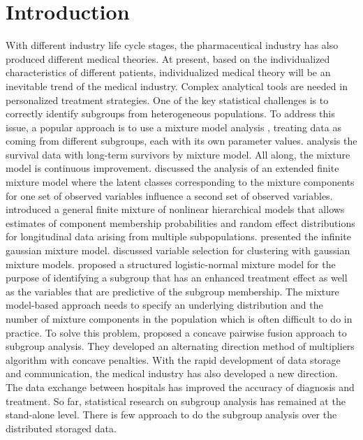 \documentclass[review]{elsarticle}
\begin{document}
\section{Introduction}
With different industry life cycle stages, the pharmaceutical industry has also produced different medical theories. At present,  based on the individualized characteristics of different patients, individualized medical theory will be an inevitable trend of the medical industry. Complex analytical tools are needed in personalized treatment strategies. One of the key statistical challenges is to correctly identify subgroups from heterogeneous populations. To address this issue, a popular approach is to use a mixture model analysis \cite{everitt1981finite}, treating data as coming from different subgroups, each with its own parameter values. \cite{farewell1982use} analysis the survival data with long-term survivors by mixture model. All along, the mixture model is continuous improvement. \cite{muthen1999finite} discussed the analysis of an extended finite mixture model where the latent classes corresponding to the mixture components for one set of observed variables influence a second set of observed variables. \cite{pauler2000mixture} introduced a general finite mixture of nonlinear hierarchical models that allows estimates of component membership probabilities and random effect distributions for longitudinal data arising from multiple subpopulations. \cite{rasmussen2000infinite} presented the infinite gaussian mixture model. \cite{maugis2009variable} discussed variable selection for clustering with gaussian mixture models. \cite{shen2015inference} proposed a structured logistic-normal mixture model for the purpose of identifying a subgroup that has an enhanced treatment effect as well as the variables that are predictive of the subgroup membership. The mixture model-based approach needs to specify an underlying distribution and the number of mixture components in the population which is often difficult to do in practice. To solve this problem, \cite{ma2017concave} proposed a concave pairwise fusion approach to subgroup analysis. They developed an alternating direction method of multipliers algorithm with concave penalties. With the rapid development of data storage and communication, the medical industry has also developed a new direction. The data exchange between hospitals has improved the accuracy of diagnosis and treatment. So far, statistical research on subgroup analysis has remained at the stand-alone level. There is few approach to do the subgroup analysis over the distributed storaged data. 
\end{document}
